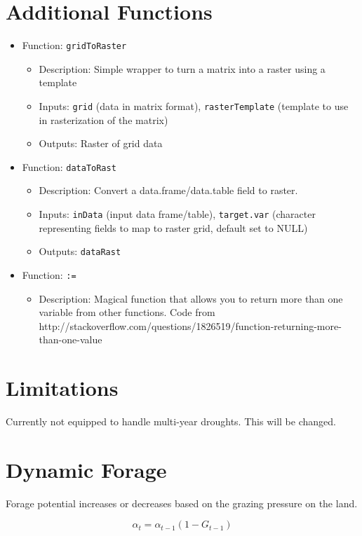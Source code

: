 \documentclass[11pt]{article}
\begin{document}
\section{Additional Functions}
\begin{itemize}
\item Function: \verb!gridToRaster!
	\begin{itemize}
	\item Description: Simple wrapper to turn a matrix into a raster using a template
    \item Inputs: \verb!grid! (data in matrix format), \verb!rasterTemplate! (template to use in rasterization of the matrix)
    \item Outputs: Raster of grid data
	\end{itemize}
\item Function: \verb!dataToRast!
	\begin{itemize}
	\item Description: Convert a data.frame/data.table field to raster.
	\item Inputs: \verb!inData! (input data frame/table), \verb!target.var! (character representing fields to map to raster grid, default set to NULL)
	\item Outputs: \verb!dataRast!
	\end{itemize}
\item Function: \verb!:=!
	\begin{itemize}
	\item Description: Magical function that allows you to return more than one variable from other functions. Code from http://stackoverflow.com/questions/1826519/function-returning-more-than-one-value
	\end{itemize}
\end{itemize}




\section{Limitations}
Currently not equipped to handle multi-year droughts. This will be changed. 


\section{Dynamic Forage}

Forage potential increases or decreases based on the grazing pressure on the land. 

\begin{equation}
\alpha_t = \alpha_{t-1} (1 - G_{t-1})
\end{equation}
\end{document}
